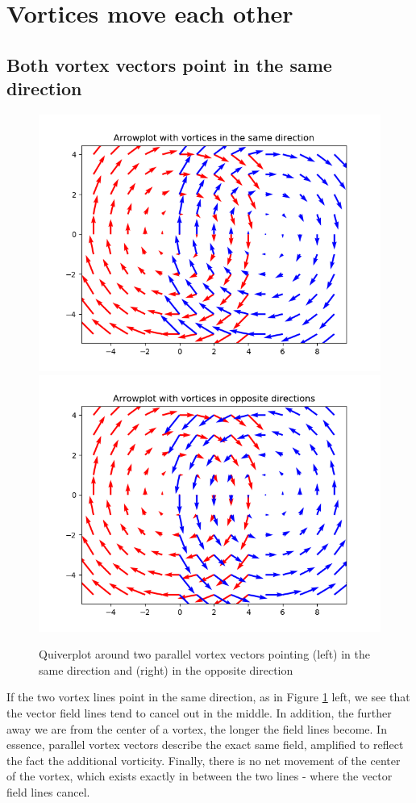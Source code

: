 \documentclass[english]{article}
\begin{document}
\section{Vortices move each other}
\subsection{Both vortex vectors point in the same direction}
\begin{figure}
	\centering
	\includegraphics[scale=0.45]{same_direction.png}\includegraphics[scale=0.45]{opposite_direction.png}
	\caption{Quiverplot around two parallel vortex vectors pointing (left) 
	in the same direction and (right) in the opposite direction}
	\label{fig:vortices}
\end{figure}
If the two vortex lines point in the same direction, as in Figure 
\ref{fig:vortices} left, we see that the vector field lines tend to cancel
out in the middle. 
In addition, the further away we are from the center of a vortex, the 
longer the field lines become.
In essence, parallel vortex vectors describe the exact same field, amplified
to reflect the fact the additional vorticity.
Finally, there is no net movement of the center of the vortex, which exists
exactly in between the two lines - where the vector field lines cancel.
\end{document}
